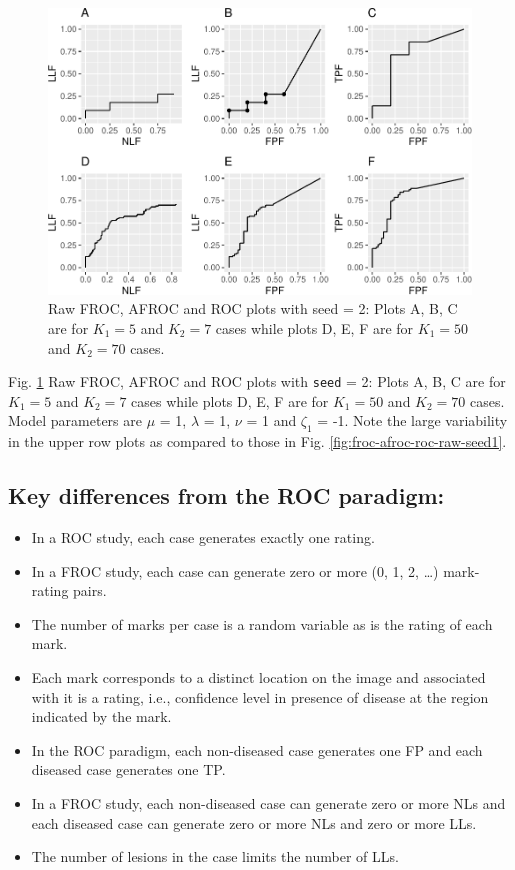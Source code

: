\documentclass[
]{book}
\begin{document}
\begin{figure}
\centering
\includegraphics{13b-froc-empirical2_files/figure-latex/froc-afroc-roc-raw-seed2-1.pdf}
\caption{\label{fig:froc-afroc-roc-raw-seed2}Raw FROC, AFROC and ROC plots with seed = 2: Plots A, B, C are for \(K_1 = 5\) and \(K_2 = 7\) cases while plots D, E, F are for \(K_1 = 50\) and \(K_2 = 70\) cases.}
\end{figure}

Fig. \ref{fig:froc-afroc-roc-raw-seed2} Raw FROC, AFROC and ROC plots with \texttt{seed} = 2: Plots A, B, C are for \(K_1 = 5\) and \(K_2 = 7\) cases while plots D, E, F are for \(K_1 = 50\) and \(K_2 = 70\) cases. Model parameters are \(\mu\) = 1, \(\lambda\) = 1, \(\nu\) = 1 and \(\zeta_1\) = -1. Note the large variability in the upper row plots as compared to those in Fig. \ref{fig:froc-afroc-roc-raw-seed1}.

\hypertarget{key-differences-from-the-roc-paradigm}{%
\subsection{Key differences from the ROC paradigm:}\label{key-differences-from-the-roc-paradigm}}

\begin{itemize}
\item
  In a ROC study, each case generates exactly one rating.
\item
  In a FROC study, each case can generate zero or more (0, 1, 2, \ldots) mark-rating pairs.
\item
  The number of marks per case is a random variable as is the rating of each mark.
\item
  Each mark corresponds to a distinct location on the image and associated with it is a rating, i.e., confidence level in presence of disease at the region indicated by the mark.
\item
  In the ROC paradigm, each non-diseased case generates one FP and each diseased case generates one TP.
\item
  In a FROC study, each non-diseased case can generate zero or more NLs and each diseased case can generate zero or more NLs and zero or more LLs.
\item
  The number of lesions in the case limits the number of LLs.
\end{itemize}
\end{document}
